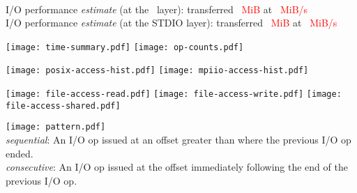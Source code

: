 \documentclass[11pt,letterpaper,twocolumn]{article}
\begin{document}
\selectfont

\pagestyle{fancy}

\ifdefined\incompletelog
{}
\newpage
\fi

\begin{figure*}[!h]
\centering
\subfigure
{
    
}\\
\vspace{1em}
\ifdefined\inclperf
I/O performance \emph{estimate} (at the \perflayer \ layer):
transferred \textcolor{red}{\perfbytes \ MiB} at \textcolor{red}{\perfest \ MiB/s\\}
\fi
\ifdefined\inclstdio
I/O performance \emph{estimate} (at the STDIO layer):
transferred \textcolor{red}{\stdioperfbytes \ MiB} at \textcolor{red}{\stdioperfest \ MiB/s}
\fi

\vspace{3em}
\subfigure
{
    \texttt{[image: time-summary.pdf]}
}
\subfigure
{
    \texttt{[image: op-counts.pdf]}
}
\end{figure*}

\begin{figure*}[!h]
\centering
\subfigure
{
    \texttt{[image: posix-access-hist.pdf]}
}
\ifdefined\inclmpiio
\subfigure
{
    \texttt{[image: mpiio-access-hist.pdf]}
}
\fi
\end{figure*}

\begin{figure*}[!h]
\centering
\subfigure
{
    
}
\subfigure
{
    
}
\end{figure*}

\begin{figure*}[!h]
\centering
\subfigure
{
    \texttt{[image: file-access-read.pdf]}
}
\subfigure
{
    \texttt{[image: file-access-write.pdf]}
}
\subfigure
{
    \texttt{[image: file-access-shared.pdf]}
}
\subfigure
{
    
}
\subfigure
{
    
}
\end{figure*}

\begin{figure*}[!h]
\centering
\subfigure
{
    \texttt{[image: pattern.pdf]}
}
\scriptsize
\\ \textit{sequential}: An I/O op issued at an offset greater than where the previous I/O op ended.
\\ \textit{consecutive}: An I/O op issued at the offset immediately following the end of the previous I/O op. \\
\normalsize
\subfigure
{
    
}
\end{figure*}
\end{document}
